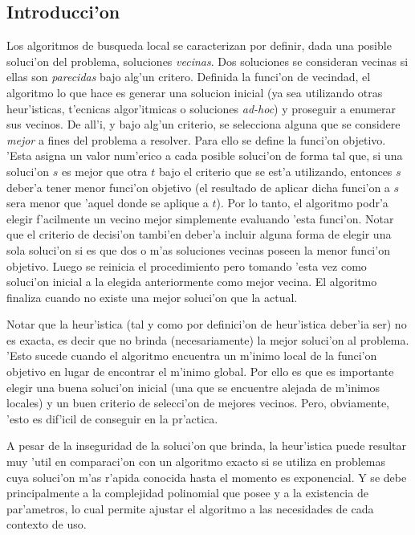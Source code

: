 \subsection{Introducci'on}
Los algoritmos de busqueda local se caracterizan por definir, dada una posible soluci'on del problema, soluciones \emph{vecinas}. Dos soluciones se consideran vecinas si ellas son \emph{parecidas} bajo alg'un critero. Definida la funci'on de vecindad, el algoritmo lo que hace es generar una solucion inicial (ya sea utilizando otras heur'isticas, t'ecnicas algor'itmicas o soluciones \emph{ad-hoc}) y proseguir a enumerar sus vecinos. De all'i, y bajo alg'un criterio, se selecciona alguna que se considere \emph{mejor} a fines del problema a resolver. Para ello se define la funci'on objetivo. 'Esta asigna un valor num'erico a cada posible soluci'on de forma tal que, si una soluci'on $s$ es mejor que otra $t$ bajo el criterio que se est'a utilizando, entonces $s$ deber'a tener menor funci'on objetivo (el resultado de aplicar dicha funci'on a $s$ sera menor que 'aquel donde se aplique a $t$). Por lo tanto, el algoritmo podr'a elegir f'acilmente un vecino mejor simplemente evaluando 'esta funci'on. Notar que el criterio de decisi'on tambi'en deber'a incluir alguna forma de elegir una sola soluci'on si es que dos o m'as soluciones vecinas poseen la menor funci'on objetivo. Luego se reinicia el procedimiento pero tomando 'esta vez como soluci'on inicial a la elegida anteriormente como mejor vecina. El algoritmo finaliza cuando no existe una mejor soluci'on que la actual.

Notar que la heur'istica (tal y como por definici'on de heur'istica deber'ia ser) no es exacta, es decir que no brinda (necesariamente) la mejor soluci'on al problema. 'Esto sucede cuando el algoritmo encuentra un m'inimo local de la funci'on objetivo en lugar de encontrar el m'inimo global. Por ello es que es importante elegir una buena soluci'on inicial (una que se encuentre alejada de m'inimos locales) y un buen criterio de selecci'on de mejores vecinos. Pero, obviamente, 'esto es dif'icil de conseguir en la pr'actica.

A pesar de la inseguridad de la soluci'on que brinda, la heur'istica puede resultar muy 'util en comparaci'on con un algoritmo exacto si se utiliza en problemas cuya soluci'on m'as r'apida conocida hasta el momento es exponencial. Y se debe principalmente a la complejidad polinomial que posee y a la existencia de par'ametros, lo cual permite ajustar el algoritmo a las necesidades de cada contexto de uso.
